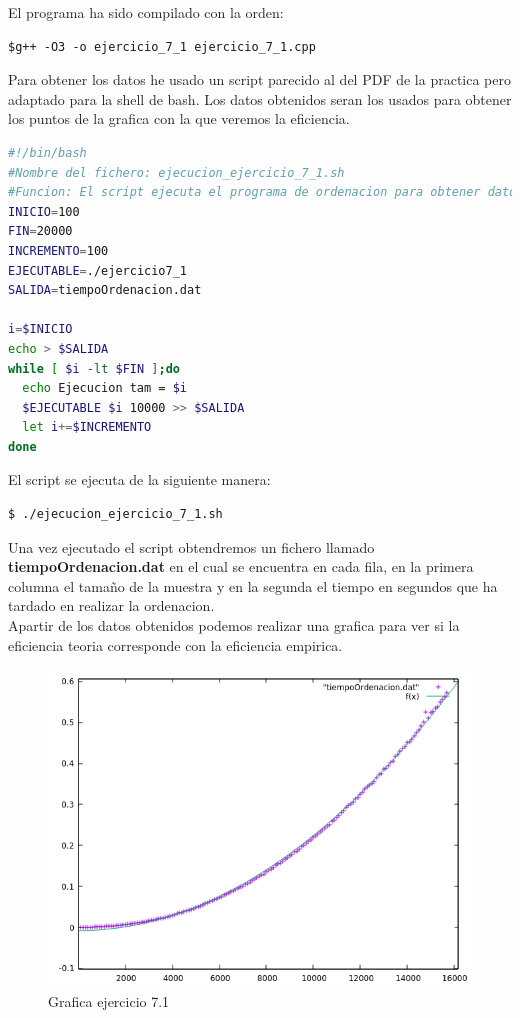 \documentclass[12pt,a4psprt]{article}
\begin{document}
El programa ha sido compilado con la orden:
\begin{verbatim}
$g++ -O3 -o ejercicio_7_1 ejercicio_7_1.cpp
\end{verbatim}
Para obtener los datos he usado un script parecido al del PDF de la practica pero adaptado para la shell de bash. Los datos obtenidos seran los usados para obtener los puntos de la grafica con la que veremos la eficiencia.
\begin{lstlisting}[language=bash]
#!/bin/bash
#Nombre del fichero: ejecucion_ejercicio_7_1.sh
#Funcion: El script ejecuta el programa de ordenacion para obtener datos de eficiencia
INICIO=100
FIN=20000
INCREMENTO=100
EJECUTABLE=./ejercicio7_1
SALIDA=tiempoOrdenacion.dat

i=$INICIO
echo > $SALIDA
while [ $i -lt $FIN ];do
  echo Ejecucion tam = $i
  $EJECUTABLE $i 10000 >> $SALIDA
  let i+=$INCREMENTO
done


\end{lstlisting}
El script se ejecuta de la siguiente manera:
\begin{verbatim}
$ ./ejecucion_ejercicio_7_1.sh
\end{verbatim}

Una vez ejecutado el script obtendremos un fichero llamado \textbf{tiempoOrdenacion.dat} en el cual se encuentra en cada fila, en la primera columna el tamaño de la muestra y en la segunda el tiempo en segundos que ha tardado en realizar la ordenacion.
\pagebreak
\\
Apartir de los datos obtenidos  podemos realizar una grafica para ver si la eficiencia teoria corresponde con la eficiencia empirica.
\begin{figure}[h]
\begin{center}
	\includegraphics[scale=1]{image/grafica_7_1.png}
\end{center}
\caption{Grafica ejercicio 7.1}

\end{figure}
\end{document}
